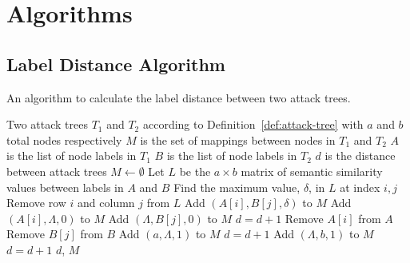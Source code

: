 \section{Algorithms}
\label{appendix:algorithms}

\subsection{Label Distance Algorithm}
\label{appendix:alg:label-distance}
\begin{algorithm}[H]
    \caption{An algorithm to calculate the label distance between two attack trees.}
    \label{alg:label-distance}
    \begin{algorithmic}
        \State Two attack trees $T_1$ and $T_2$ according to Definition~\ref{def:attack-tree} with $a$ and $b$ total nodes respectively
        \State $M$ is the set of mappings between nodes in $T_1$ and $T_2$
        \State $A$ is the list of node labels in $T_1$
        \State $B$ is the list of node labels in $T_2$
        \State $d$ is the distance between attack trees
        \State $M \gets \emptyset$
        \State Let $L$ be the $a \times b$ matrix of semantic similarity values between labels in $A$ and $B$
        \State Find the maximum value, $\delta$, in $L$ at index $i, j$
        \State Remove row $i$ and column $j$ from $L$
        \If{$\delta > \epsilon$}
        \State Add $(A[i], B[j], \delta)$ to $M$
        \Else
        \State Add $(A[i], \Lambda, 0)$ to $M$
        \State Add $(\Lambda, B[j], 0)$ to $M$
        \State $d = d + 1$
        \EndIf
        \State Remove $A[i]$ from $A$
        \State Remove $B[j]$ from $B$
        \EndWhile
        \State Add $(a, \Lambda, 1)$ to $M$
        \State $d = d + 1$
        \EndFor
        \State Add $(\Lambda, b, 1)$ to $M$
        \State $d = d + 1$
        \EndFor
        \State \Return $d$, $M$
    \end{algorithmic}
\end{algorithm}

